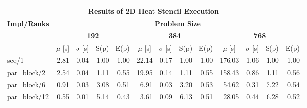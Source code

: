 \begin{tabular}{|lllllllllllll|}
\hline
\multicolumn{13}{|c|}{\textbf{Results of 2D Heat Stencil Execution}} \\ \hline
\multicolumn{1}{|c|}{\textbf{Impl/Ranks}} & \multicolumn{12}{c|}{\textbf{Problem Size}} \\ \hline
\multicolumn{1}{|c|}{\textbf{}} & \multicolumn{4}{c|}{\textbf{192}} & \multicolumn{4}{c|}{\textbf{384}} & \multicolumn{4}{c|}{\textbf{768}} \\ \hline
\multicolumn{1}{|l|}{} & \multicolumn{1}{c|}{$\mu$ [s]} & \multicolumn{1}{c|}{$\sigma$ [s]} & \multicolumn{1}{c|}{S(p)} & \multicolumn{1}{c|}{E(p)} & \multicolumn{1}{c|}{$\mu$ [s]} & \multicolumn{1}{c|}{$\sigma$ [s]} & \multicolumn{1}{c|}{S(p)} & \multicolumn{1}{c|}{E(p)} & \multicolumn{1}{c|}{$\mu$ [s]} & \multicolumn{1}{c|}{$\sigma$ [s]} & \multicolumn{1}{c|}{S(p)} & \multicolumn{1}{c|}{E(p)} \\ \hline
\multicolumn{1}{|l|}{seq/1}  & \multicolumn{1}{r|}{2.81} & \multicolumn{1}{r|}{0.04} & \multicolumn{1}{r|}{1.00} & \multicolumn{1}{r|}{1.00}  & \multicolumn{1}{r|}{22.14} & \multicolumn{1}{r|}{0.17} & \multicolumn{1}{r|}{1.00} & \multicolumn{1}{r|}{1.00}  & \multicolumn{1}{r|}{176.03} & \multicolumn{1}{r|}{1.06} & \multicolumn{1}{r|}{1.00} & \multicolumn{1}{r|}{1.00}  \\ \hline
\multicolumn{1}{|l|}{par\_block/2}  & \multicolumn{1}{r|}{2.54} & \multicolumn{1}{r|}{0.04} & \multicolumn{1}{r|}{1.11} & \multicolumn{1}{r|}{0.55}  & \multicolumn{1}{r|}{19.95} & \multicolumn{1}{r|}{0.14} & \multicolumn{1}{r|}{1.11} & \multicolumn{1}{r|}{0.55}  & \multicolumn{1}{r|}{158.43} & \multicolumn{1}{r|}{0.86} & \multicolumn{1}{r|}{1.11} & \multicolumn{1}{r|}{0.56}  \\ \hline
\multicolumn{1}{|l|}{par\_block/6}  & \multicolumn{1}{r|}{0.91} & \multicolumn{1}{r|}{0.03} & \multicolumn{1}{r|}{3.08} & \multicolumn{1}{r|}{0.51}  & \multicolumn{1}{r|}{6.91} & \multicolumn{1}{r|}{0.03} & \multicolumn{1}{r|}{3.20} & \multicolumn{1}{r|}{0.53}  & \multicolumn{1}{r|}{54.62} & \multicolumn{1}{r|}{0.31} & \multicolumn{1}{r|}{3.22} & \multicolumn{1}{r|}{0.54}  \\ \hline
\multicolumn{1}{|l|}{par\_block/12}  & \multicolumn{1}{r|}{0.55} & \multicolumn{1}{r|}{0.01} & \multicolumn{1}{r|}{5.14} & \multicolumn{1}{r|}{0.43}  & \multicolumn{1}{r|}{3.61} & \multicolumn{1}{r|}{0.09} & \multicolumn{1}{r|}{6.13} & \multicolumn{1}{r|}{0.51}  & \multicolumn{1}{r|}{28.05} & \multicolumn{1}{r|}{0.44} & \multicolumn{1}{r|}{6.28} & \multicolumn{1}{r|}{0.52}  \\ \hline

\end{tabular}
